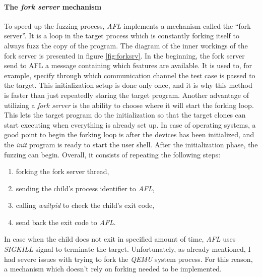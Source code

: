 \paragraph{The \textit{fork server} mechanism}
To speed up the fuzzing process, \textit{AFL} implements a mechanism called the “fork server”. It is a loop in the target process which is constantly forking itself to always fuzz the copy of the program. The diagram of the inner workings of the fork server is presented in figure \ref{fig:forksrv}. In the beginning, the fork server send to AFL a message containing which features are available. It is used to, for example, specify through which communication channel the test case is passed to the target. This initialization setup is done only once, and it is why this method is faster than just repeatedly staring the target program. Another advantage of utilizing a \textit{fork server} is the ability to choose where it will start the forking loop. This lets the target program do the initialization so that the target clones can start executing when everything is already set up. In case of operating systems, a good point to begin the forking loop is after the devices has been initialized, and the \textit{init} program is ready to start the user shell. After the initialization phase, the fuzzing can begin. Overall, it consists of repeating the following steps:
\begin{enumerate}
    \item forking the fork server thread,
    \item sending the child's process identifier to \textit{AFL},
    \item calling \textit{waitpid} to check the child's exit code,
    \item send back the exit code to \textit{AFL}.
\end{enumerate}
In case when the child does not exit in specified amount of time, \textit{AFL} uses \textit{SIGKILL} signal to terminate the target. Unfortunately, as already mentioned, I had severe issues with trying to fork the \textit{QEMU} system process. For this reason, a mechanism which doesn't rely on forking needed to be implemented. 

